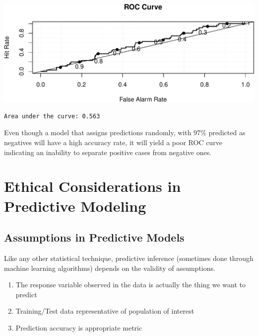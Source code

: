 \documentclass[
  letterpaper,
  DIV=11,
  numbers=noendperiod]{scrreprt}
\newenvironment{Shaded}{\begin{snugshade}}{\end{snugshade}}
\newcommand{\AttributeTok}[1]{\textcolor[rgb]{0.40,0.45,0.13}{#1}}
\newcommand{\FunctionTok}[1]{\textcolor[rgb]{0.28,0.35,0.67}{#1}}
\newcommand{\NormalTok}[1]{\textcolor[rgb]{0.00,0.23,0.31}{#1}}
\newcommand{\SpecialCharTok}[1]{\textcolor[rgb]{0.37,0.37,0.37}{#1}}
\begin{document}
\includegraphics{Ch7_files/figure-pdf/unnamed-chunk-117-1.pdf}

\begin{Shaded}
\end{Shaded}

\begin{verbatim}
Area under the curve: 0.563
\end{verbatim}

Even though a model that assigns predictions randomly, with 97\%
predicted as negatives will have a high accuracy rate, it will yield a
poor ROC curve indicating an inability to separate positive cases from
negative ones.

\section{Ethical Considerations in Predictive
Modeling}\label{ethical-considerations-in-predictive-modeling}

\subsection{Assumptions in Predictive
Models}\label{assumptions-in-predictive-models}

Like any other statistical technique, predictive inference (sometimes
done through machine learning algorithms) depends on the validity of
assumptions.

\begin{enumerate}
\def\labelenumi{\arabic{enumi}.}
\item
  The response variable observed in the data is actually the thing we
  want to predict\\
\item
  Training/Test data representative of population of interest
\item
  Prediction accuracy is appropriate metric
\end{enumerate}
\end{document}
